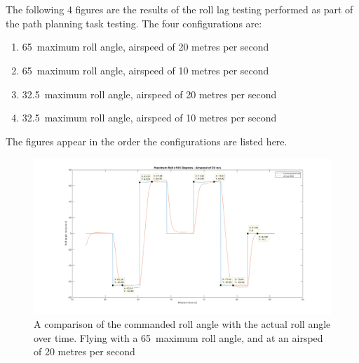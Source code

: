 \chapter{} 
\label{app:MATLABRoll}

\graphicspath{{Appendix4/Figs/}}

\renewcommand{\thefigure}{D\arabic{figure}}

\setcounter{figure}{0}

The following 4 figures are the results of the roll lag testing performed as part of the path planning task testing. The four configurations are:

\begin{enumerate}
	\item 65\degree\  maximum roll angle, airspeed of 20 metres per second
	\item 65\degree\  maximum roll angle, airspeed of 10 metres per second
	\item 32.5\degree\  maximum roll angle, airspeed of 20 metres per second
	\item 32.5\degree\  maximum roll angle, airspeed of 10 metres per second
\end{enumerate}

The figures appear in the order the configurations are listed here.

\begin{figure} 
\centering    
\includegraphics[scale=0.5]{65_20_cursors}
\caption{A comparison of the commanded roll angle with the actual roll angle over time. Flying with a 65\degree\  maximum roll angle, and at an airsped of 20 metres per second}
\end{figure}

